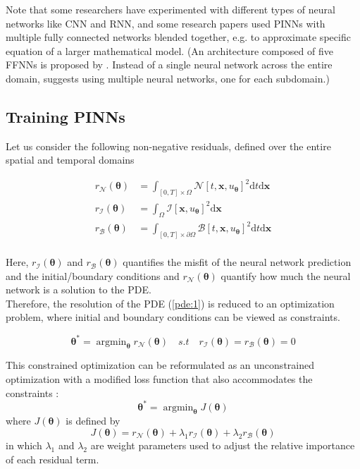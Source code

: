 \documentclass[12pt,openany]{amsbook}
\newcommand{\bbm}[1]{{\mathbf{#1}}}
\DeclareMathOperator*{\argmin}{argmin}   %
\begin{document}
Note that some researchers have experimented with different types of neural networks like CNN and RNN, 
and some research papers used PINNs  with multiple fully connected networks blended together, 
e.g. to approximate specific equation of a larger mathematical model. 
(An architecture composed of five FFNNs is proposed by \cite{HAGHIGHAT2021113741}.
Instead of a single neural network across the entire domain, \cite{https://doi.org/10.48550/arxiv.2107.07871} 
suggests using multiple neural networks, one for each subdomain.)

\subsection{Training PINNs}
\label{sec:training}

Let us consider the following non-negative residuals, defined over the entire spatial and temporal domains

\begin{align*}
    r_{\mathcal{N}}(\bm \theta) &= \int_{[0,T]\times\Omega} \mathcal{N}[t,\bbm x, u_{\bm \theta}]^2 \mathrm{d}t\mathrm{d}\bbm x \\
    r_{\mathcal{I}}(\bm \theta) &= \int_{\Omega} \mathcal{I}[\bbm x, u_{\bm \theta}]^2 \mathrm{d}\bbm x \\
    r_{\mathcal{B}}(\bm \theta) &= \int_{[0,T]\times\partial\Omega} \mathcal{B}[t,\bbm x, u_{\bm \theta}]^2 \mathrm{d}t\mathrm{d}\bbm x\\
\end{align*}

Here, $r_{\mathcal{I}}(\bm \theta)$ and $r_{\mathcal{B}}(\bm \theta)$ quantifies the misfit of the neural network prediction 
and the initial/boundary conditions and $r_{\mathcal{N}}(\bm \theta)$ quantify how much the neural network is a solution to the PDE.\\

Therefore, the resolution of the PDE (\ref{pde:1}) is reduced to an optimization problem, where initial and boundary conditions can be 
viewed as constraints. 

\begin{equation}
    \bm \theta^* = \argmin_{\bm \theta} r_{\mathcal{N}}(\bm \theta) \quad s.t \quad r_{\mathcal{I}}(\bm \theta) = r_{\mathcal{B}}(\bm \theta) = 0
\end{equation}

This constrained optimization can be reformulated as an unconstrained optimization with a modified loss function
that also accommodates the constraints : 
\begin{equation}
    \bm \theta^* = \argmin_{\bm \theta} J(\bm \theta)
\end{equation}
where $J(\bm \theta)$ is defined by 
\begin{equation}
    J(\bm \theta) = r_{\mathcal{N}}(\bm \theta) + \lambda_1 r_{\mathcal{I}}(\bm \theta) + \lambda_2 r_{\mathcal{B}}(\bm \theta)
\end{equation}
in which $\lambda_1$ and $\lambda_2$ are weight parameters used to adjust the relative importance of each residual term.\\
\end{document}
